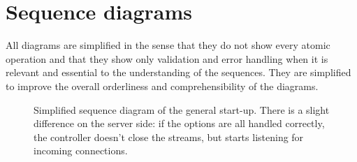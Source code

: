 \documentclass[a4paper]{article}
\begin{document}
\newpage\section{Sequence diagrams}\label{app:sd}
All diagrams are simplified in the sense that they do not show every atomic operation and that they show only validation and error handling when it is relevant and essential to the understanding of the sequences. They are simplified to improve the overall orderliness and comprehensibility of the diagrams.
\begin{figure}[hb]
  \centering
  \caption{Simplified sequence diagram of the general start-up. There is a slight difference on the server side: if the options are all handled correctly, the controller doesn't close the streams, but starts listening for incoming connections.}
  \label{fig:sd_generalstartup}
\end{figure}
\end{document}
